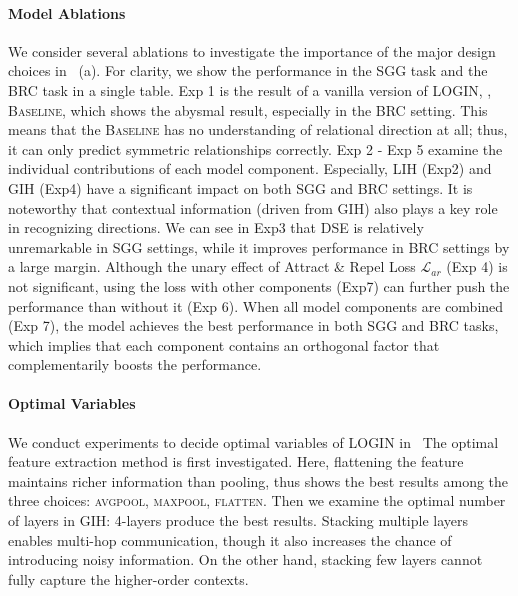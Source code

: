         \paragraph{Model Ablations}
            We consider several ablations to investigate the importance of the major design choices in~ (a). For clarity, we show the performance in the SGG task and the BRC task in a single table. 
            Exp 1 is the result of a vanilla version of LOGIN, \ie, \textsc{Baseline}, which shows the abysmal result, especially in the BRC setting. This means that the \textsc{Baseline} has no understanding of relational direction at all; thus, it can only predict symmetric relationships correctly.
            Exp 2 - Exp 5 examine the individual contributions of each model component. Especially, LIH (Exp2) and GIH (Exp4) have a significant impact on both SGG and BRC settings. It is noteworthy that contextual information (driven from GIH) also plays a key role in recognizing directions.
            We can see in Exp3 that DSE is relatively unremarkable in SGG settings, while it improves performance in BRC settings by a large margin.
            Although the unary effect of Attract \& Repel Loss $\mathcal{L}_{ar}$ (Exp 4) is not significant, using the loss with other components (Exp7) can further push the performance than without it (Exp 6).
            When all model components are combined (Exp 7), the model achieves the best performance in both SGG and BRC tasks, which implies that each component contains an orthogonal factor that complementarily boosts the performance.
            
        \paragraph{Optimal Variables}
            We conduct experiments to decide optimal variables of LOGIN in~
            The optimal feature extraction method is first investigated. Here, flattening the feature maintains richer information than pooling, thus shows the best results among the three choices: \textsc{avgpool}, \textsc{maxpool}, \textsc{flatten}.
            Then we examine the optimal number of layers in GIH: 4-layers produce the best results.
            Stacking multiple layers enables multi-hop communication, though it also increases the chance of introducing noisy information.
            On the other hand, stacking few layers cannot fully capture the higher-order contexts.
        
